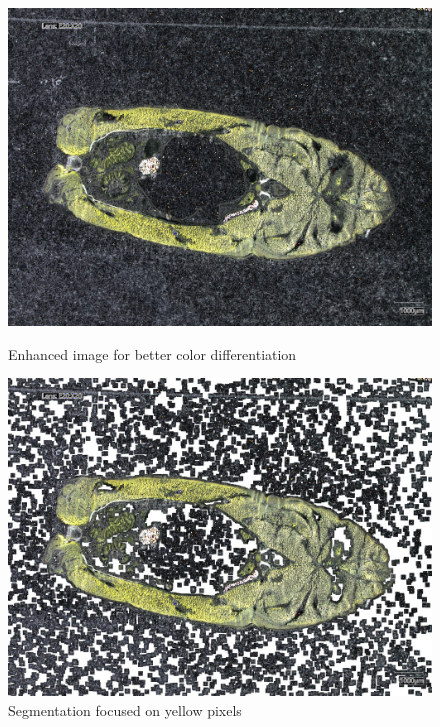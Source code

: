 \begin{figure}[H]
    \centering
    \begin{minipage}{0.40\textwidth}
        \centering
        \includegraphics[width=\textwidth]{./fig/threshold/enhanced_image.jpg}
        \caption{Enhanced image for better color differentiation}
        \label{fig:enhanced_image}
    \end{minipage}
    \begin{minipage}{0.4\textwidth}
        \centering
        \includegraphics[width=\textwidth]{./fig/threshold/yellowpic.jpg}
        \caption{Segmentation focused on yellow pixels}
        \label{fig:yellowpic}
    \end{minipage}
\end{figure}

